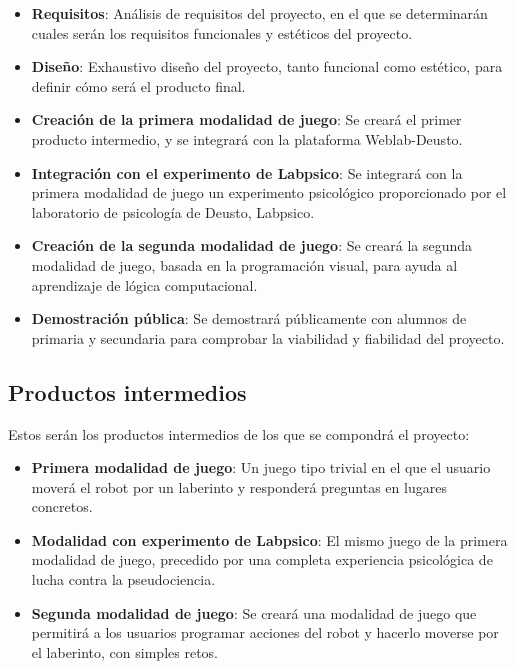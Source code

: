\begin{itemize}
\item \textbf{Requisitos}: Análisis de requisitos del proyecto, en el que se determinarán cuales
serán los requisitos funcionales y estéticos del proyecto.

\item \textbf{Diseño}: Exhaustivo diseño del proyecto, tanto funcional como estético, para definir
cómo será el producto final.

\item \textbf{Creación de la primera modalidad de juego}: Se creará el primer producto intermedio,
y se integrará con la plataforma Weblab-Deusto.

\item \textbf{Integración con el experimento de Labpsico}: Se integrará con la primera modalidad de
juego un experimento psicológico proporcionado por el laboratorio de psicología de Deusto, Labpsico.

\item \textbf{Creación de la segunda modalidad de juego}: Se creará la segunda modalidad de juego,
basada en la programación visual, para ayuda al aprendizaje de lógica computacional.

\item \textbf{Demostración pública}: Se demostrará públicamente con alumnos de primaria y secundaria
para comprobar la viabilidad y fiabilidad del proyecto.
\end{itemize}

\subsection{Productos intermedios}

Estos serán los productos intermedios de los que se compondrá el proyecto:

\begin{itemize}
\item \textbf{Primera modalidad de juego}: Un juego tipo trivial en el que el usuario moverá el
robot por un laberinto y responderá preguntas en lugares concretos.

\item \textbf{Modalidad con experimento de Labpsico}: El mismo juego de la primera modalidad de
juego,  precedido por una completa experiencia psicológica de lucha contra la pseudociencia.

\item \textbf{Segunda modalidad de juego}: Se creará una modalidad de juego que permitirá a los
usuarios programar acciones del robot y hacerlo moverse por el laberinto, con simples retos.
\end{itemize}

